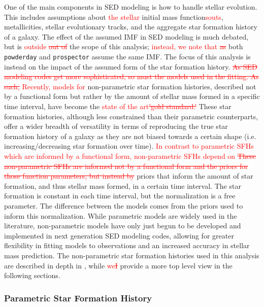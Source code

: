 \documentclass[twocolumn]{aastex62}
\newcommand{\red}[1]{{\textcolor{red}{#1}}}
\begin{document}
One of the main components in SED modeling is how to handle stellar evolution. This includes assumptions about \red{the stellar }initial mass function\red{sout{s}}, metallicities, stellar evolutionary tracks, and the aggregate star formation history of a galaxy. The effect of the assumed IMF in SED modeling is much debated, but is \red{outside \sout{out of}} the scope of this analysis; \red{instead, we note that \sout{as}} both \texttt{powderday} and \texttt{prospector} assume the same IMF. The focus of this analysis is instead on the impact of the assumed form of the star formation history. \red{\sout{As SED modeling codes get more sophisticated, so must the models used in the fitting. As such,}} \red{Recently, models for} non-parametric star formation histories, described not by a functional form but rather by the amount of stellar mass formed in a specific time interval, have become the \red{state of the art\sout{'gold standard.'}} These star formation histories, although less constrained than their parametric counterparts, offer a wider breadth of versatility in terms of reproducing the true star formation history of a galaxy as they are not biased towards a certain shape (i.e. increasing/decreasing star formation over time).  \red{In contrast to parametric SFHs which are informed by a functional form, non-parametric SFHs depend on }\red{\sout{These non-parametric SFHs are informed not by a functional form and the priors for those function parameters, but instead by }}priors that inform the amount of star formation, and thus stellar mass formed, in a certain time interval. The star formation is constant in each time interval, but the normalization is a free parameter. The difference between the models comes from the priors used to inform this normalization. While parametric models are widely used in the literature, non-parametric models have only just begun to be developed and implemented in next generation SED modeling codes, allowing for greater flexibility in fitting models to observations and an increased accuracy in stellar mass prediction. The non-parametric star formation histories used in this analysis are described in depth in \citet{leja_how_2018}, while \red{we\sout{I}} provide a more top level view in the following sections. 




\subsubsection{Parametric Star Formation History}
\end{document}
